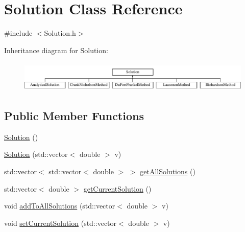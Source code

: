 \hypertarget{class_solution}{}\section{Solution Class Reference}
\label{class_solution}


{\ttfamily \#include $<$Solution.\+h$>$}

Inheritance diagram for Solution\+:\begin{figure}[H]
\begin{center}
\leavevmode
\includegraphics[height=1.473684cm]{class_solution}
\end{center}
\end{figure}
\subsection*{Public Member Functions}
\begin{DoxyCompactItemize}
\item 
\hyperlink{class_solution_ab55bd4b023d596ce11aaf737b9a6123b}{Solution} ()
\item 
\hyperlink{class_solution_a3a2983c7a229e6d7408471b4dc48fe61}{Solution} (std\+::vector$<$ double $>$ v)
\item 
std\+::vector$<$ std\+::vector$<$ double $>$ $>$ \hyperlink{class_solution_abd28abd062adb793866fd5e1c8ef8639}{get\+All\+Solutions} ()
\item 
std\+::vector$<$ double $>$ \hyperlink{class_solution_ae92d4a6070f6e5879698754fa5547ee3}{get\+Current\+Solution} ()
\item 
void \hyperlink{class_solution_a0ea58d9480ccb4e344c377f4861e1e7f}{add\+To\+All\+Solutions} (std\+::vector$<$ double $>$ v)
\item 
void \hyperlink{class_solution_a32dad1b34b687cb439a2a60881e50402}{set\+Current\+Solution} (std\+::vector$<$ double $>$ v)
\end{DoxyCompactItemize}
